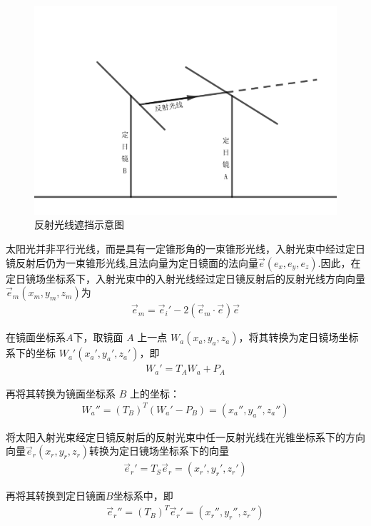 \documentclass[../main.tex]{subfiles}
\begin{document}
    \begin{figure}[H]
    \centering
    \includegraphics[width=.9\textwidth]{8}
    \caption{反射光线遮挡示意图}
    \label{1.29}
\end{figure}
\par 太阳光并非平行光线，而是具有一定锥形角的一束锥形光线，入射光束中经过定日镜反射后仍为一束锥形光线,且法向量为定日镜面的法向量$\vec{e}(e_x,e_y,e_z)$.因此，在定日镜场坐标系下，入射光束中的入射光线经过定日镜反射后的反射光线方向向量$\vec{e}_m(x_m, y_m, z_m)$为
\begin{align}  \label{1.30}
\vec{e}_m = \vec{e}_i' - 2 (\vec{e}_m \cdot \vec{e}) \vec{e}
\end{align}
\par 在镜面坐标系$A$下，取镜面 \( A \) 上一点 \( W_a (x_a,y_a,z_a) \)，将其转换为定日镜场坐标系下的坐标 \( W_a' (x_a', y_a', z_a') \)，即
\begin{align}\label{1.30}
   W_a' = T_A W_a + P_A
\end{align}
\par 再将其转换为镜面坐标系 \( B \) 上的坐标：
\begin{align}\label{1.31}
 W_a'' = (T_B)^T (W_a' - P_B)=(x_a'', y_a'', z_a'')
\end{align}
\par 将太阳入射光束经定日镜反射后的反射光束中任一反射光线在光锥坐标系下的方向向量$\vec{e}_r(x_r, y_r, z_r)$转换为定日镜场坐标系下的向量
\begin{align}    \label{1.32}
\vec{e}_r'=T_S\vec{e}_r=\left( x_r',y_r',z_r' \right) 
\end{align}
\par 再将其转换到定日镜面$B$坐标系中，即
\begin{align} \label{1.33}
  \vec{e}_r'' = (T_B)^T \vec{e}_r' = (x_r'', y_r'', z_r'')
\end{align}
\end{document}
